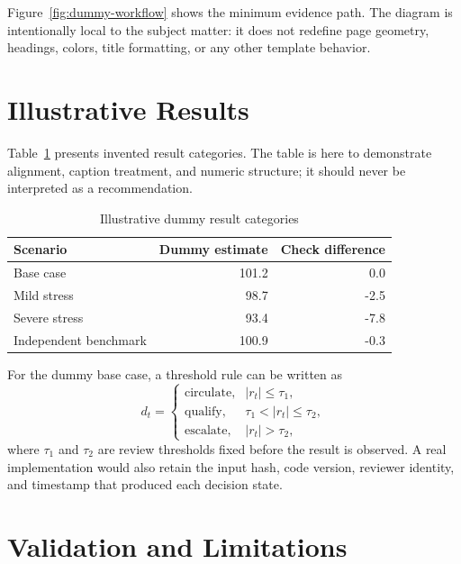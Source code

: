 \documentclass[conference]{IEEEtran}
\begin{document}
Figure~\ref{fig:dummy-workflow} shows the minimum evidence path. The diagram
is intentionally local to the subject matter: it does not redefine page
geometry, headings, colors, title formatting, or any other template behavior.

\section{Illustrative Results}

\lipsum[3-5]

Table~\ref{tab:dummy-results} presents invented result categories. The table
is here to demonstrate alignment, caption treatment, and numeric structure;
it should never be interpreted as a recommendation.

\begin{table}[!t]
  \caption{Illustrative dummy result categories}
  \label{tab:dummy-results}
  \centering
  \begin{tabular}{lrr}
    \toprule
    Scenario & Dummy estimate & Check difference \\
    \midrule
    Base case & 101.2 & 0.0 \\
    Mild stress & 98.7 & -2.5 \\
    Severe stress & 93.4 & -7.8 \\
    Independent benchmark & 100.9 & -0.3 \\
    \bottomrule
  \end{tabular}
\end{table}

For the dummy base case, a threshold rule can be written as
\begin{equation}
  d_t =
  \begin{cases}
    \text{circulate}, & |r_t| \leq \tau_1, \\
    \text{qualify}, & \tau_1 < |r_t| \leq \tau_2, \\
    \text{escalate}, & |r_t| > \tau_2,
  \end{cases}
  \label{eq:dummy-threshold}
\end{equation}
where $\tau_1$ and $\tau_2$ are review thresholds fixed before the result is
observed. A real implementation would also retain the input hash, code version,
reviewer identity, and timestamp that produced each decision state.

\section{Validation and Limitations}
\end{document}
